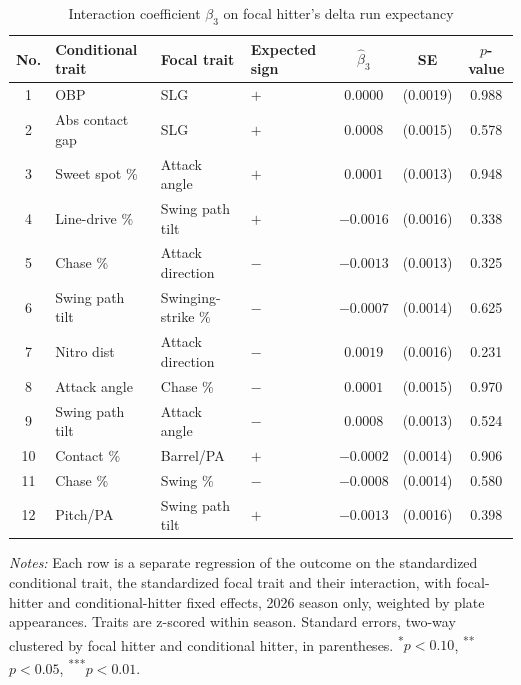 \begin{table}[htbp]
\centering
\small
\caption{Interaction coefficient $\beta_3$ on focal hitter's delta run expectancy}
\label{tab:table1_focal_2026}
\begin{tabular}{clllccc}
\toprule
No. & Conditional trait & Focal trait & Expected sign & $\hat\beta_3$ & SE & $p$-value \\
\midrule
1 & OBP & SLG & $+$ & $0.0000$ & (0.0019) & 0.988 \\
2 & Abs contact gap & SLG & $+$ & $0.0008$ & (0.0015) & 0.578 \\
3 & Sweet spot \% & Attack angle & $+$ & $0.0001$ & (0.0013) & 0.948 \\
4 & Line-drive \% & Swing path tilt & $+$ & $-0.0016$ & (0.0016) & 0.338 \\
5 & Chase \% & Attack direction & $-$ & $-0.0013$ & (0.0013) & 0.325 \\
6 & Swing path tilt & Swinging-strike \% & $-$ & $-0.0007$ & (0.0014) & 0.625 \\
7 & Nitro dist & Attack direction & $-$ & $0.0019$ & (0.0016) & 0.231 \\
8 & Attack angle & Chase \% & $-$ & $0.0001$ & (0.0015) & 0.970 \\
9 & Swing path tilt & Attack angle & $-$ & $0.0008$ & (0.0013) & 0.524 \\
10 & Contact \% & Barrel/PA & $+$ & $-0.0002$ & (0.0014) & 0.906 \\
11 & Chase \% & Swing \% & $-$ & $-0.0008$ & (0.0014) & 0.580 \\
12 & Pitch/PA & Swing path tilt & $+$ & $-0.0013$ & (0.0016) & 0.398 \\
\bottomrule
\end{tabular}
\par\smallskip\parbox{0.95\textwidth}{\footnotesize \textit{Notes:} Each row is a separate regression of the outcome on the standardized conditional trait, the standardized focal trait and their interaction, with focal-hitter and conditional-hitter fixed effects, 2026 season only, weighted by plate appearances. Traits are z-scored within season. Standard errors, two-way clustered by focal hitter and conditional hitter, in parentheses. \textsuperscript{*}$p<0.10$, \textsuperscript{**}$p<0.05$, \textsuperscript{***}$p<0.01$.}
\end{table}
